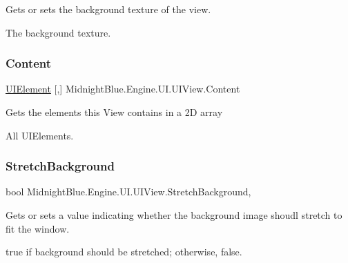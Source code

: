 Gets or sets the background texture of the view. 

The background texture.\hypertarget{class_midnight_blue_1_1_engine_1_1_u_i_1_1_u_i_view_afa135eeb28b11055b98404ae9090f9c9}{}\label{class_midnight_blue_1_1_engine_1_1_u_i_1_1_u_i_view_afa135eeb28b11055b98404ae9090f9c9} 
\subsubsection{\texorpdfstring{Content}{Content}}
{\footnotesize\ttfamily \hyperlink{class_midnight_blue_1_1_engine_1_1_u_i_1_1_u_i_element}{U\+I\+Element} \mbox{[},\mbox{]} Midnight\+Blue.\+Engine.\+U\+I.\+U\+I\+View.\+Content\hspace{0.3cm}{\ttfamily [get]}}



Gets the elements this View contains in a 2D array 

All U\+I\+Elements.\hypertarget{class_midnight_blue_1_1_engine_1_1_u_i_1_1_u_i_view_ab7cdc0c4026c631e292bf2a33cded169}{}\label{class_midnight_blue_1_1_engine_1_1_u_i_1_1_u_i_view_ab7cdc0c4026c631e292bf2a33cded169} 
\subsubsection{\texorpdfstring{Stretch\+Background}{StretchBackground}}
{\footnotesize\ttfamily bool Midnight\+Blue.\+Engine.\+U\+I.\+U\+I\+View.\+Stretch\+Background\hspace{0.3cm}{\ttfamily [get]}, {\ttfamily [set]}}



Gets or sets a value indicating whether the background image shoudl stretch to fit the window. 

{\ttfamily true} if background should be stretched; otherwise, {\ttfamily false}.\hypertarget{class_midnight_blue_1_1_engine_1_1_u_i_1_1_u_i_view_a99db2ffa2be79afc3a2daca105c6eb98}{}\label{class_midnight_blue_1_1_engine_1_1_u_i_1_1_u_i_view_a99db2ffa2be79afc3a2daca105c6eb98} 

